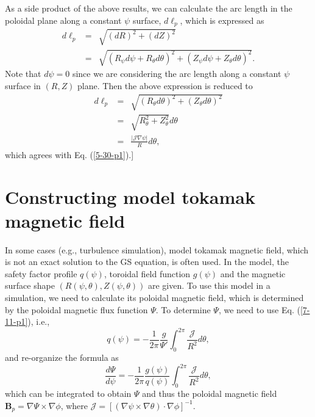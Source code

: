 \documentclass{article}
\begin{document}
As a side product of the above results, we can calculate the arc length in the
poloidal plane along a constant $\psi$ surface, $d \ell_p$, which is expressed
as
\begin{eqnarray*}
  d \ell_p & = & \sqrt{(d R)^2 + (d Z)^2}\\
  & = & \sqrt{(R_{\psi} d \psi + R_{\theta} d \theta)^2 + (Z_{\psi} d \psi +
  Z_{\theta} d \theta)^2} .
\end{eqnarray*}
Note that $d \psi = 0$ since we are considering the arc length along a
constant $\psi$ surface in $(R, Z)$ plane. Then the above expression is
reduced to
\begin{eqnarray}
  d \ell_p & = & \sqrt{(R_{\theta} d \theta)^2 + (Z_{\theta} d \theta)^2}
  \nonumber\\
  & = & \sqrt{R_{\theta}^2 + Z_{\theta}^2} d \theta \nonumber\\
  & = & \frac{|\mathcal{J} \nabla \psi |}{R} d \theta,  \label{6-8-e1}
\end{eqnarray}
which agrees with Eq. (\ref{5-30-p1}).]

\section{Constructing model tokamak magnetic field}

In some cases (e.g., turbulence simulation), model tokamak magnetic field,
which is not an exact solution to the GS equation, is often used. In the
model, the safety factor profile $q (\psi)$, toroidal field function $g
(\psi)$ and the magnetic surface shape $(R (\psi, \theta), Z (\psi, \theta))$
are given. To use this model in a simulation, we need to calculate its
poloidal magnetic field, which is determined by the poloidal magnetic flux
function $\Psi$. To determine $\Psi$, we need to use Eq. (\ref{7-11-p1}),
i.e.,
\begin{equation}
  q (\psi) = - \frac{1}{2 \pi}  \frac{g}{\Psi'} \int_0^{2 \pi}
  \frac{\mathcal{J}}{R^2} d \theta,
\end{equation}
and re-organize the formula as
\begin{equation}
  \frac{d \Psi}{d \psi} = - \frac{1}{2 \pi}  \frac{g (\psi)}{q (\psi)}
  \int_0^{2 \pi} \frac{\mathcal{J}}{R^2} d \theta,
\end{equation}
which can be integrated to obtain $\Psi$ and thus the poloidal magnetic field
$\mathbf{B}_p = \nabla \Psi \times \nabla \phi$, where $\mathcal{J} = [(\nabla
\psi \times \nabla \theta) \cdot \nabla \phi]^{- 1}$.
\end{document}

